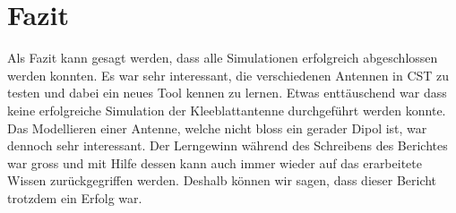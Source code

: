 \section{Fazit}

Als Fazit kann gesagt werden, dass alle Simulationen erfolgreich abgeschlossen werden konnten. Es war sehr interessant, die verschiedenen Antennen in CST zu testen und dabei ein neues Tool kennen zu lernen. Etwas enttäuschend war dass keine erfolgreiche Simulation der Kleeblattantenne durchgeführt werden konnte. Das Modellieren einer Antenne, welche nicht bloss ein gerader Dipol ist, war dennoch sehr interessant. Der Lerngewinn während des Schreibens des Berichtes war gross und mit Hilfe dessen kann auch immer wieder auf das erarbeitete Wissen zurückgegriffen werden. Deshalb können wir sagen, dass dieser Bericht trotzdem ein Erfolg war.